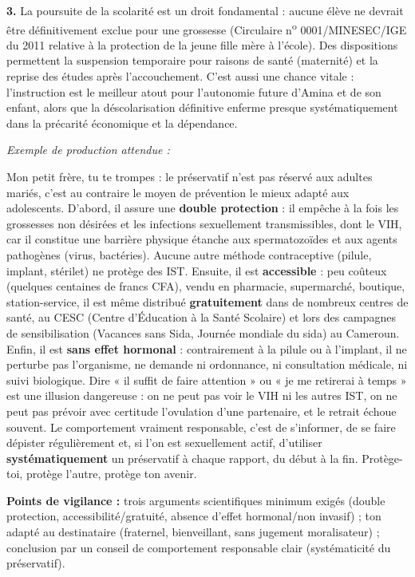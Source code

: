 \documentclass[11pt]{article}
\begin{document}
\begin{corrige}
\textbf{3.} La poursuite de la scolarité est un droit fondamental : aucune élève ne devrait être définitivement exclue pour une grossesse (Circulaire n\textsuperscript{o} 0001/MINESEC/IGE du 2011 relative à la protection de la jeune fille mère à l'école). Des dispositions permettent la suspension temporaire pour raisons de santé (maternité) et la reprise des études après l'accouchement. C'est aussi une chance vitale : l'instruction est le meilleur atout pour l'autonomie future d'Amina et de son enfant, alors que la déscolarisation définitive enferme presque systématiquement dans la précarité économique et la dépendance.
\end{corrige}

\begin{corrige}

\textit{Exemple de production attendue :}

Mon petit frère, tu te trompes : le préservatif n'est pas réservé aux adultes mariés, c'est au contraire le moyen de prévention le mieux adapté aux adolescents. D'abord, il assure une \textbf{double protection} : il empêche à la fois les grossesses non désirées et les infections sexuellement transmissibles, dont le VIH, car il constitue une barrière physique étanche aux spermatozoïdes et aux agents pathogènes (virus, bactéries). Aucune autre méthode contraceptive (pilule, implant, stérilet) ne protège des IST. Ensuite, il est \textbf{accessible} : peu coûteux (quelques centaines de francs CFA), vendu en pharmacie, supermarché, boutique, station-service, il est même distribué \textbf{gratuitement} dans de nombreux centres de santé, au CESC (Centre d'Éducation à la Santé Scolaire) et lors des campagnes de sensibilisation (Vacances sans Sida, Journée mondiale du sida) au Cameroun. Enfin, il est \textbf{sans effet hormonal} : contrairement à la pilule ou à l'implant, il ne perturbe pas l'organisme, ne demande ni ordonnance, ni consultation médicale, ni suivi biologique. Dire « il suffit de faire attention » ou « je me retirerai à temps » est une illusion dangereuse : on ne peut pas voir le VIH ni les autres IST, on ne peut pas prévoir avec certitude l'ovulation d'une partenaire, et le retrait échoue souvent. Le comportement vraiment responsable, c'est de s'informer, de se faire dépister régulièrement et, si l'on est sexuellement actif, d'utiliser \textbf{systématiquement} un préservatif à chaque rapport, du début à la fin. Protège-toi, protège l'autre, protège ton avenir.

\textbf{Points de vigilance :} trois arguments scientifiques minimum exigés (double protection, accessibilité/gratuité, absence d'effet hormonal/non invasif) ; ton adapté au destinataire (fraternel, bienveillant, sans jugement moralisateur) ; conclusion par un conseil de comportement responsable clair (systématicité du préservatif).
\end{corrige}
\end{document}
